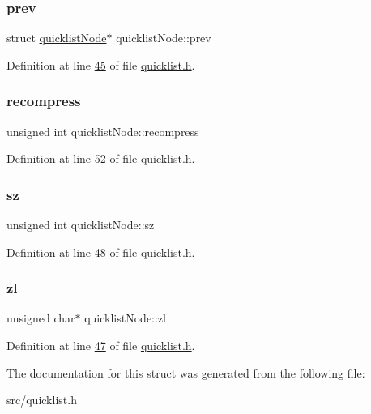 \subsubsection{\texorpdfstring{prev}{prev}}
{\footnotesize\ttfamily struct \hyperlink{structquicklistNode}{quicklist\+Node}$\ast$ quicklist\+Node\+::prev}



Definition at line \hyperlink{quicklist_8h_source_l00045}{45} of file \hyperlink{quicklist_8h_source}{quicklist.\+h}.

\mbox{\label{structquicklistNode_aeca3c3bbe1e81ab82de62baf0c15b20c}} 
\subsubsection{\texorpdfstring{recompress}{recompress}}
{\footnotesize\ttfamily unsigned int quicklist\+Node\+::recompress}



Definition at line \hyperlink{quicklist_8h_source_l00052}{52} of file \hyperlink{quicklist_8h_source}{quicklist.\+h}.

\mbox{\label{structquicklistNode_a45cf87a732a821df88c116a4ed2a12c2}} 
\subsubsection{\texorpdfstring{sz}{sz}}
{\footnotesize\ttfamily unsigned int quicklist\+Node\+::sz}



Definition at line \hyperlink{quicklist_8h_source_l00048}{48} of file \hyperlink{quicklist_8h_source}{quicklist.\+h}.

\mbox{\label{structquicklistNode_ac0273a27d0d72fc290d00b01a95e1b7b}} 
\subsubsection{\texorpdfstring{zl}{zl}}
{\footnotesize\ttfamily unsigned char$\ast$ quicklist\+Node\+::zl}



Definition at line \hyperlink{quicklist_8h_source_l00047}{47} of file \hyperlink{quicklist_8h_source}{quicklist.\+h}.



The documentation for this struct was generated from the following file\+:\begin{DoxyCompactItemize}
\item 
src/quicklist.\+h\end{DoxyCompactItemize}

